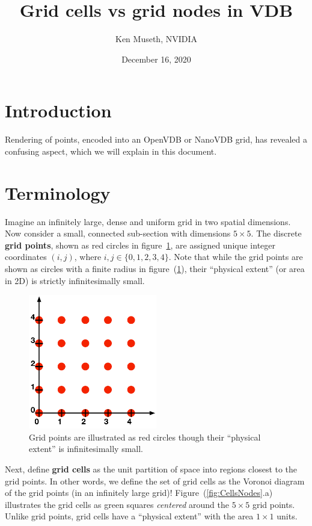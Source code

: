\documentclass[12pt, letterpaper]{article}
\title{Grid cells vs grid nodes in VDB}
\author{Ken Museth, NVIDIA}
\date{December 16, 2020}
\begin{document}
\maketitle


\section{Introduction}
Rendering of points, encoded into an OpenVDB or NanoVDB grid, has revealed a confusing aspect, which we will explain in this document.

\section{Terminology}
Imagine an infinitely large, dense and uniform grid in two spatial dimensions. Now consider a small, connected sub-section with dimensions  $5\times5$.  The discrete {\bf grid points}, shown as red circles in figure~\ref{fig:GridPoints}, are assigned unique integer coordinates $(i,j)$, where $i,j\in\{0,1,2,3,4\}$. Note that while the grid points are shown as circles with a finite radius in figure~(\ref{fig:GridPoints}), their ``physical extent'' (or area in 2D) is strictly infinitesimally small.


\begin{figure}[htbp]
\begin{center}
\includegraphics[width=0.5\textwidth]{GridPoints.pdf}
\caption{Grid points are illustrated as red circles though their ``physical extent'' is infinitesimally small.}
\label{fig:GridPoints}
\end{center}
\end{figure}

Next, define {\bf grid cells} as the unit partition of space into regions closest to the grid points. In other words, we define the set of grid cells as the Voronoi diagram of the grid points (in an infinitely large grid)!  Figure~(\ref{fig:CellsNodes}.a) illustrates the grid cells as green squares \emph{centered} around the $5\times5$ grid points. Unlike grid points, grid cells have a ``physical extent'' with the area $1\times1$ units.
\end{document}
